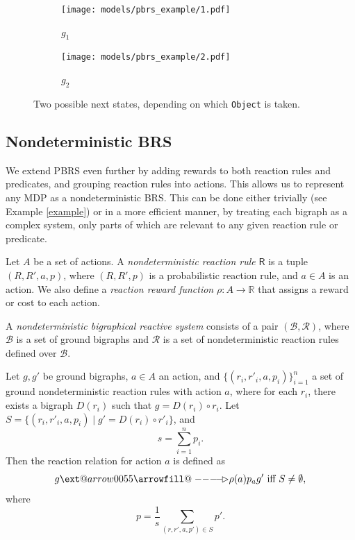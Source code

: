 \documentclass[runningheads]{llncs}
\makeatletter
\providecommand\longrightarrowrhd{\relbar\joinrel\relbar\joinrel\mathrel\rhd}
\providecommand*\xrightarrowrhd[2][]{\ext@arrow 0055{\arrowfill@\relbar\relbar\longrightarrowrhd}{#1}{#2}}
\makeatother
\begin{document}
\begin{figure}
  \centering
  \begin{subfigure}{0.45\textwidth}
    \centering
    \texttt{[image: models/pbrs\_example/1.pdf]}
    \caption{$g_1$}
  \end{subfigure}
  \hfill
  \begin{subfigure}{0.45\textwidth}
    \centering
    \texttt{[image: models/pbrs\_example/2.pdf]}
    \caption{$g_2$}
  \end{subfigure}
  \caption{Two possible next states, depending on which \texttt{Object} is
    taken.}
  \label{pbrs_next_states}
\end{figure}

\subsection{Nondeterministic BRS}

We extend PBRS even further by adding rewards to both reaction rules and
predicates, and grouping reaction rules into actions. This allows us to
represent any MDP as a nondeterministic BRS. This can be done either trivially
(see Example \ref{example}) or in a more efficient manner, by treating each
bigraph as a complex system, only parts of which are relevant to any given
reaction rule or predicate.

\begin{definition}
  Let $A$ be a set of actions. A \emph{nondeterministic reaction rule}
  $\mathsf{R}$ is a tuple $(R, R', a, p)$, where $(R, R', p)$ is a probabilistic
  reaction rule, and $a \in A$ is an action. We also define a \emph{reaction
    reward function} $\rho : A \to \mathbb{R}$ that assigns a reward or cost to
  each action.
\end{definition}

\begin{definition}
  A \emph{nondeterministic bigraphical reactive system} consists of a pair
  $(\mathcal{B}, \mathcal{R})$, where $\mathcal{B}$ is a set of ground bigraphs
  and $\mathcal{R}$ is a set of nondeterministic reaction rules defined over
  $\mathcal{B}$.

  Let $g, g'$ be ground bigraphs, $a \in A$ an action, and $\{ (r_i, r'_i, a,
  p_i) \}_{i=1}^n$ a set of ground nondeterministic reaction rules with action
  $a$, where for each $r_i$, there exists a bigraph $D(r_i)$ such that $g =
  D(r_i) \circ r_i$. Let $S = \{ (r_i, r'_i, a, p_i) \mid g' = D(r_i) \circ r'_i
  \}$, and
  \[ s = \sum_{i=1}^n p_i. \]
  Then the reaction relation for action $a$ is defined as
  \[ g \xrightarrowrhd[\rho(a)]{p}_a g' \text{ iff } S \ne \emptyset, \]
  where
  \[ p = \frac{1}{s}\sum_{(r, r', a, p') \in S} p'. \]
\end{definition}
\end{document}
